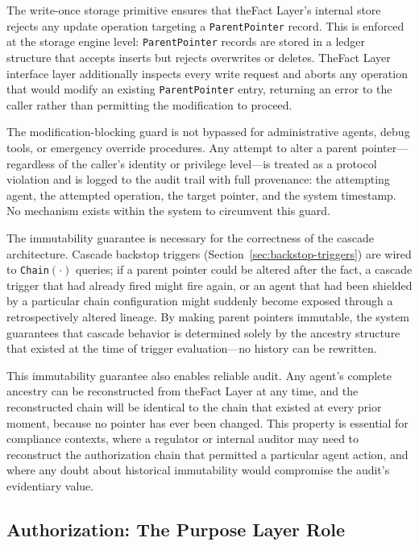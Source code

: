 The write-once storage primitive ensures that theFact Layer's internal store rejects any update operation targeting a \texttt{ParentPointer} record. This is enforced at the storage engine level: \texttt{ParentPointer} records are stored in a ledger structure that accepts inserts but rejects overwrites or deletes. TheFact Layer interface layer additionally inspects every write request and aborts any operation that would modify an existing \texttt{ParentPointer} entry, returning an error to the caller rather than permitting the modification to proceed.

The modification-blocking guard is not bypassed for administrative agents, debug tools, or emergency override procedures. Any attempt to alter a parent pointer—regardless of the caller's identity or privilege level—is treated as a protocol violation and is logged to the audit trail with full provenance: the attempting agent, the attempted operation, the target pointer, and the system timestamp. No mechanism exists within the system to circumvent this guard.

The immutability guarantee is necessary for the correctness of the cascade architecture. Cascade backstop triggers (Section~\ref{sec:backstop-triggers}) are wired to \texttt{Chain}$(\cdot)$ queries; if a parent pointer could be altered after the fact, a cascade trigger that had already fired might fire again, or an agent that had been shielded by a particular chain configuration might suddenly become exposed through a retrospectively altered lineage. By making parent pointers immutable, the system guarantees that cascade behavior is determined solely by the ancestry structure that existed at the time of trigger evaluation—no history can be rewritten.

This immutability guarantee also enables reliable audit. Any agent's complete ancestry can be reconstructed from theFact Layer at any time, and the reconstructed chain will be identical to the chain that existed at every prior moment, because no pointer has ever been changed. This property is essential for compliance contexts, where a regulator or internal auditor may need to reconstruct the authorization chain that permitted a particular agent action, and where any doubt about historical immutability would compromise the audit's evidentiary value.

\subsection{Authorization: The Purpose Layer Role}\label{sec:spawn-authorization}

